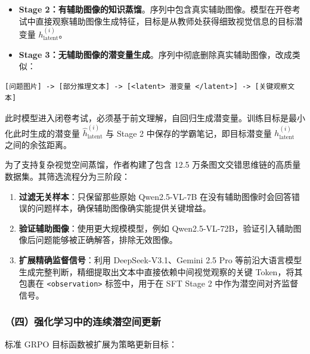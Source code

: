 \begin{itemize}
\tightlist
\item
  \textbf{Stage 2：有辅助图像的知识蒸馏}。序列中包含真实辅助图像。模型在开卷考试中直接观察辅助图像生成特征，目标是从教师处获得细致视觉信息的目标潜变量 \(h_{\text{latent}}^{(i)}\)。
\item
{}
  \textbf{Stage 3：无辅助图像的潜变量生成}。序列中彻底删除真实辅助图像，改成类似：
\end{itemize}

\begin{verbatim}
[问题图片] -> [部分推理文本] -> [<latent> 潜变量 </latent>] -> [关键观察文本]
\end{verbatim}

此时模型进入闭卷考试，必须基于前文理解，自回归生成潜变量。训练目标是最小化此时生成的潜变量 \(\hat h_{\text{latent}}^{(i)}\) 与 Stage 2 中保存的学霸笔记，即目标潜变量 \(h_{\text{latent}}^{(i)}\) 之间的余弦距离。

为了支持复杂视觉空间蒸馏，作者构建了包含 12.5 万条图文交错思维链的高质量数据集。其筛选流程分为三阶段：

\begin{enumerate}
\def\labelenumi{\arabic{enumi}.}
\tightlist
\item
  \textbf{过滤无关样本}：只保留那些原始 Qwen2.5-VL-7B 在没有辅助图像时会回答错误的问题样本，确保辅助图像确实能提供关键增益。
\item
  \textbf{验证辅助图像}：使用更大规模模型，例如 Qwen2.5-VL-72B，验证引入辅助图像后问题能够被正确解答，排除无效图像。
\item
  \textbf{扩展精确监督信号}：利用 DeepSeek-V3.1、Gemini 2.5 Pro 等前沿大语言模型生成完整判断，精细提取出文本中直接依赖中间视觉观察的关键 Token，将其包裹在 \texttt{\textless{}observation\textgreater{}} 标签中，用于在 SFT Stage 2 中作为潜空间对齐监督信号。
\end{enumerate}

\hypertarget{ux56dbux5f3aux5316ux5b66ux4e60ux4e2dux7684ux8fdeux7eedux6f5cux7a7aux95f4ux66f4ux65b0}{%
\subsubsection{（四）强化学习中的连续潜空间更新}\label{ux56dbux5f3aux5316ux5b66ux4e60ux4e2dux7684ux8fdeux7eedux6f5cux7a7aux95f4ux66f4ux65b0}}

标准 GRPO 目标函数被扩展为策略更新目标：


